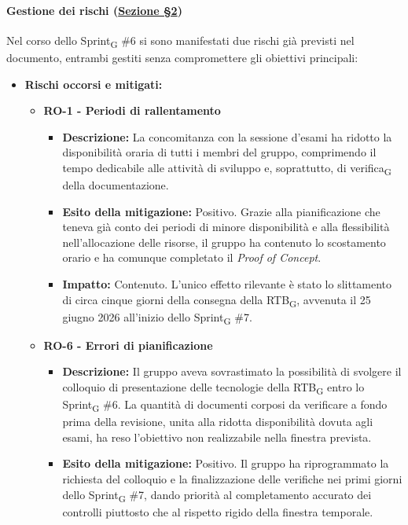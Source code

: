 \documentclass[a4paper, 10pt, colorlinks=true, linkcolor=black, urlcolor=blue, citecolor=blue, hidelinks]{article}
\begin{document}
\paragraph{Gestione dei rischi (\hyperref[tab:gestione-rischi]{Sezione \S2})}
Nel corso dello Sprint\textsubscript{G} \#6 si sono manifestati due rischi già previsti nel documento, entrambi gestiti senza compromettere gli obiettivi principali:
\begin{itemize}
    \item \textbf{Rischi occorsi e mitigati:}
    \begin{itemize}
        \item \textbf{RO-1 - Periodi di rallentamento}
        \begin{itemize}
            \item \textbf{Descrizione:} La concomitanza con la sessione d'esami ha ridotto la disponibilità oraria di tutti i membri del gruppo, comprimendo il tempo dedicabile alle attività di sviluppo e, soprattutto, di verifica\textsubscript{G} della documentazione.
            \item \textbf{Esito della mitigazione:} Positivo. Grazie alla pianificazione che teneva già conto dei periodi di minore disponibilità e alla flessibilità nell'allocazione delle risorse, il gruppo ha contenuto lo scostamento orario e ha comunque completato il \textit{Proof of Concept}.
            \item \textbf{Impatto:} Contenuto. L'unico effetto rilevante è stato lo slittamento di circa cinque giorni della consegna della RTB\textsubscript{G}, avvenuta il 25 giugno 2026 all'inizio dello Sprint\textsubscript{G} \#7.
        \end{itemize}
        \item \textbf{RO-6 - Errori di pianificazione}
        \begin{itemize}
            \item \textbf{Descrizione:} Il gruppo aveva sovrastimato la possibilità di svolgere il colloquio di presentazione delle tecnologie della RTB\textsubscript{G} entro lo Sprint\textsubscript{G} \#6. La quantità di documenti corposi da verificare a fondo prima della revisione, unita alla ridotta disponibilità dovuta agli esami, ha reso l'obiettivo non realizzabile nella finestra prevista.
            \item \textbf{Esito della mitigazione:} Positivo. Il gruppo ha riprogrammato la richiesta del colloquio e la finalizzazione delle verifiche nei primi giorni dello Sprint\textsubscript{G} \#7, dando priorità al completamento accurato dei controlli piuttosto che al rispetto rigido della finestra temporale.

\end{itemize}
\end{itemize}
\end{itemize}
\end{document}

